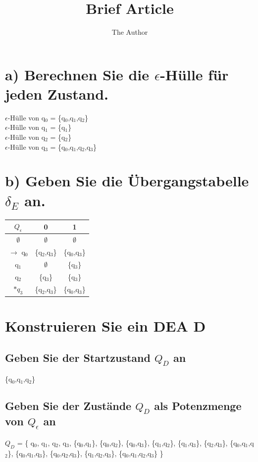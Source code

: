 \documentclass[11pt]{article} %
\title{Brief Article}
\author{The Author}
\begin{document}
\maketitle

\section{a) Berechnen Sie die $\epsilon$-Hülle für jeden Zustand.}
$\epsilon$-Hülle von q$_{0}$ = \{q$_{0}$,q$_{1}$,q$_{2}$\}\\
$\epsilon$-Hülle von q$_{1}$ = \{q$_{1}$\}\\
$\epsilon$-Hülle von q$_{2}$ = \{q$_{2}$\}\\
$\epsilon$-Hülle von q$_{3}$ = \{q$_{0}$,q$_{1}$,q$_{2}$,q$_{3}$\}\\


\section{b) Geben Sie die Übergangstabelle $\delta_{E}$ an.}
 \begin{tabular}{c|c|c}
  $Q_{\epsilon}$&0&1\\
  \hline
    $\emptyset$ &$\emptyset$&$\emptyset$\\
  $\to$ q$_{0}$ &\{q$_{2}$,q$_{3}$\}&\{q$_{0}$,q$_{3}$\}\\
  q$_{1}$ & $\emptyset$ & \{q$_{3}$\} \\
  q$_{2}$ & \{q$_{3}$\} & \{q$_{3}$\}\\
  $\ast q_{3}$ & \{q$_{2}$,q$_{3}$\} & \{q$_{0}$,q$_{3}$\}\\
 \end{tabular}
\section{Konstruieren Sie ein DEA D }
\subsection{Geben Sie der Startzustand  $Q_{D}$ an}
\{q$_{0}$,q$_{1}$,q$_{2}$\}
\subsection{Geben Sie der Zustände  $Q_{D}$ als Potenzmenge von $Q_{\epsilon}$ an}
 $Q_{D}$ = \{
q$_{0}$,
q$_{1}$,
q$_{2}$,
q$_{3}$,
\{q$_{0}$,q$_{1}$\},
\{q$_{0}$,q$_{2}$\},
\{q$_{0}$,q$_{3}$\},
\{q$_{1}$,q$_{2}$\},
\{q$_{1}$,q$_{3}$\},
\{q$_{2}$,q$_{3}$\},
\{q$_{0}$,q$_{1}$,q$_{2}$\},
\{q$_{0}$,q$_{1}$,q$_{3}$\},
\{q$_{0}$,q$_{2}$,q$_{3}$\},
\{q$_{1}$,q$_{2}$,q$_{3}$\},
\{q$_{0}$,q$_{1}$,q$_{2}$,q$_{3}$\}
\}
\end{document}
